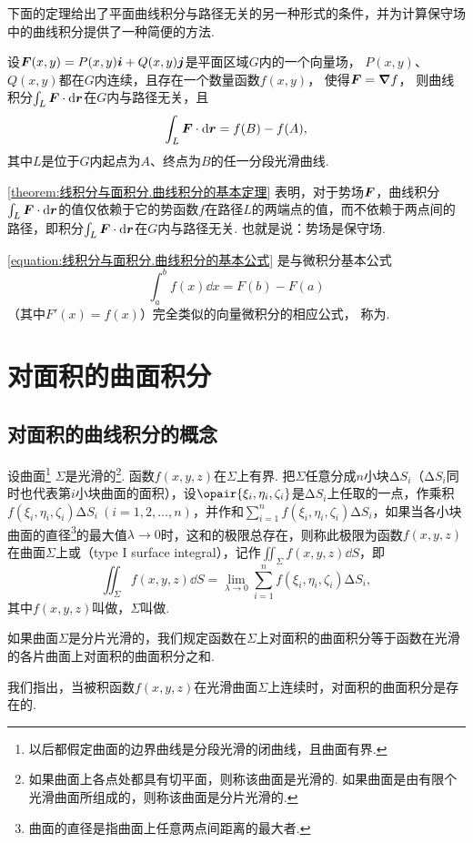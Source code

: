 下面的定理给出了平面曲线积分与路径无关的另一种形式的条件，并为计算保守场中的曲线积分提供了一种简便的方法.
\begin{theorem}[曲线积分的基本定理]\label{theorem:线积分与面积分.曲线积分的基本定理}
设\(\boldsymbol{F}(x,y)=P(x,y)\boldsymbol{i}+Q(x,y)\boldsymbol{j}\)是平面区域\(G\)内的一个向量场，%
\(P(x,y)\)、\(Q(x,y)\)都在\(G\)内连续，且存在一个数量函数\(f(x,y)\)，%
使得\(\boldsymbol{F}=\grad{f}\)，%
则曲线积分\(\int_L{\boldsymbol{F}\cdot\dd{\boldsymbol{r}}}\)在\(G\)内与路径无关，且
\begin{equation}\label{equation:线积分与面积分.曲线积分的基本公式}
\int_L \boldsymbol{F} \cdot \dd{\boldsymbol{r}}
= f(B)-f(A),
\end{equation}
其中\(L\)是位于\(G\)内起点为\(A\)、终点为\(B\)的任一分段光滑曲线.
\end{theorem}
\cref{theorem:线积分与面积分.曲线积分的基本定理} 表明，对于势场\(\boldsymbol{F}\)，曲线积分\(\int_L \boldsymbol{F}\cdot\dd{\boldsymbol{r}}\)的值仅依赖于它的势函数\(f\)在路径\(L\)的两端点的值，而不依赖于两点间的路径，即积分\(\int_L \boldsymbol{F}\cdot\dd{\boldsymbol{r}}\)在\(G\)内与路径无关.
也就是说：势场是保守场.

\cref{equation:线积分与面积分.曲线积分的基本公式}
是与微积分基本公式\[
\int_a^b f(x) \dd{x}
= F(b) - F(a)
\]（其中\(F'(x) = f(x)\)）完全类似的向量微积分的相应公式，%
称为.

\section{对面积的曲面积分}
\subsection{对面积的曲线积分的概念}
\begin{definition}
设曲面\footnote{以后都假定曲面的边界曲线是分段光滑的闭曲线，且曲面有界.}%
\(\Sigma\)是光滑的\footnote{如果曲面上各点处都具有切平面，则称该曲面是光滑的.
如果曲面是由有限个光滑曲面所组成的，则称该曲面是分片光滑的.}.
函数\(f(x,y,z)\)在\(\Sigma\)上有界.
把\(\Sigma\)任意分成\(n\)小块\(\increment S_i\)（\(\increment S_i\)同时也代表第\(i\)小块曲面的面积），设\(\opair{\xi_i,\eta_i,\zeta_i}\)是\(\increment S_i\)上任取的一点，作乘积\(f(\xi_i,\eta_i,\zeta_i) \increment S_i\ (i=1,2,\dotsc,n)\)，并作和\(\sum\limits_{i=1}^n f(\xi_i,\eta_i,\zeta_i) \increment S_i\)，如果当各小块曲面的直径\footnote{曲面的直径是指曲面上任意两点间距离的最大者.}的最大值\(\lambda\to0\)时，这和的极限总存在，则称此极限为函数\(f(x,y,z)\)在曲面\(\Sigma\)上或（type I surface integral），记作\(\iint_{\Sigma}{f(x,y,z)\dd{S}}\)，即\[
\iint_{\Sigma} f(x,y,z)\dd{S}
= \lim\limits_{\lambda\to0} \sum\limits_{i=1}^n f(\xi_i,\eta_i,\zeta_i) \increment S_i,
\]其中\(f(x,y,z)\)叫做，\(\Sigma\)叫做.

如果曲面\(\Sigma\)是分片光滑的，我们规定函数在\(\Sigma\)上对面积的曲面积分等于函数在光滑的各片曲面上对面积的曲面积分之和.
\end{definition}
我们指出，当被积函数\(f(x,y,z)\)在光滑曲面\(\Sigma\)上连续时，对面积的曲面积分是存在的.

